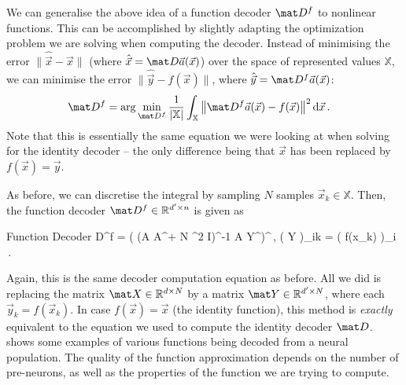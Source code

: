 \documentclass[10pt,letterpaper,oneside]{article}
\begin{document}
	We can generalise the above idea of a function decoder $\mat D^f$ to nonlinear functions. This can be accomplished by slightly adapting the optimization problem we are solving when computing the decoder. Instead of minimising the error $\| \hat{\vec x} - \vec x \|$ (where $\hat{\vec x} = \mat D \vec a(\vec x)$) over the space of represented values $\mathbb{X}$, we can minimise the error $\| \hat{\vec y} - f(\vec x) \|$, where $\hat{\vec y} = \mat D^f \vec a(\vec x)$:
	\begin{align*}
		\mat D^f &= \arg\min_{\mat D^f} \frac{1}{|\mathbb{X}|} \int_{\mathbb{X}} \big\| \mat D^f \vec a(\vec x) - f(\vec x) \big\|^2 \,\mathrm{d}{\vec x} \,.
	\end{align*}
	Note that this is essentially the same equation we were looking at when solving for the identity decoder -- the only difference being that $\vec x$ has been replaced by $f(\vec x) = \vec y$.

	As before, we can discretise the integral by sampling $N$ samples $\vec x_k \in \mathbb{X}$. Then, the function decoder $\mat D^f \in \mathbb{R}^{d' \times n}$ is given as
	\begin{ImportantEqn}{Function Decoder}
		\mat D^f = \left( (\mat A \mat A^\T + N \sigma^2 \mat I)^{-1} \mat A \mat Y^\T \right)^\T \,, \quad {} \big ( \mat Y \big )_{ik} = \big( f(\vec x_k) \big)_i  \,.
	\end{ImportantEqn}
	Again, this is the same decoder computation equation as before. All we did is replacing the matrix $\mat X \in \mathbb{R}^{d \times N}$ by a matrix $\mat Y \in \mathbb{R}^{d' \times N}$, where each $\vec y_k = f(\vec x_k)$. In case $f(\vec x) = \vec x$ (the identity function), this method is \emph{exactly} equivalent to the equation we used to compute the identity decoder $\mat D$.  shows some examples of various functions being decoded from a neural population. The quality of the function approximation depends on the number of pre-neurons, as well as the properties of the function we are trying to compute.
	\pagebreak
\end{document}
